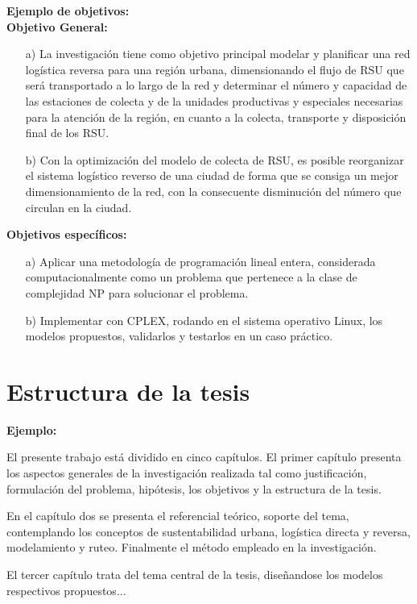 {\bf Ejemplo de objetivos:}\\
{\bf Objetivo General:}
\begin{enumerate}
\item[a)] La investigación tiene como objetivo principal modelar y planificar una red logística reversa para una región urbana, dimensionando el flujo de RSU que será transportado a lo largo de la red y determinar el número y capacidad de las estaciones de colecta y de la unidades productivas y especiales necesarias para la atención de la región, en cuanto a la colecta, transporte y disposición final de los RSU.
\vskip 0.3cm
\item[b)]Con la optimización del modelo de colecta de RSU, es posible reorganizar el sistema logístico reverso de una ciudad de forma que se consiga un mejor dimensionamiento de la red, con la consecuente disminución del número que circulan en la ciudad.
\end{enumerate}
\vskip 0.2cm
{\bf Objetivos específicos:}
\begin{enumerate}
\item[a)] Aplicar una metodología de programación lineal entera, considerada computacionalmente como un problema que pertenece a la clase de complejidad NP \citep{Korte} para solucionar el problema.
\item[b)] Implementar con CPLEX, rodando en el sistema operativo Linux, los modelos propuestos, validarlos y testarlos en un caso práctico.
\end{enumerate}




\section{Estructura de la tesis}

{\bf Ejemplo:}\par
\vskip 0.1cm
El presente trabajo está dividido en cinco capítulos. El primer capítulo presenta los aspectos generales de la investigación realizada tal como justificación, formulación del problema, hipótesis, los objetivos y la estructura de la tesis.

En el capítulo dos se presenta el referencial teórico, soporte del tema, contemplando los conceptos de sustentabilidad urbana, logística directa y reversa, modelamiento y ruteo. Finalmente el método empleado en la investigación.

El tercer capítulo trata del tema central de la tesis, diseñandose los modelos respectivos propuestos...   

